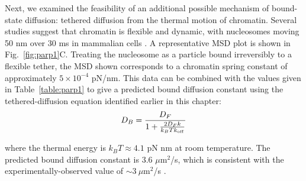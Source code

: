 Next, we examined the feasibility of an additional possible mechanism of bound-state diffusion: tethered diffusion from the thermal motion of chromatin.  Several studies suggest that chromatin is flexible and dynamic, with nucleosomes moving 50 nm over 30 ms in mammalian cells \cite{nozaki17, maeshima16, hihara12,nozaki13}.  A representative MSD plot is shown in Fig.~\ref{fig:parp1}C.  Treating the nucleosome as a particle bound irreversibly to a flexible tether, the MSD shown corresponds to a chromatin spring constant of approximately $5\times 10^{-4}$ pN/nm.  This data can be combined with the values given in Table~\ref{table:parp1} to give a predicted bound diffusion constant  using the tethered-diffusion equation identified earlier in this chapter:
\begin{equation}
D_B = \frac{D_F}{1+\frac{2D_Fk}{k_BTk_{\rm off}}}
\end{equation}

%

where the thermal energy is $k_BT \approx 4.1$ pN nm at room temperature.  The predicted bound diffusion constant is 3.6 $\mu$m$^2$/s, which is consistent with the experimentally-observed value of $\sim 3\ \mu$m$^2$/s \cite{mahadevan18}.

